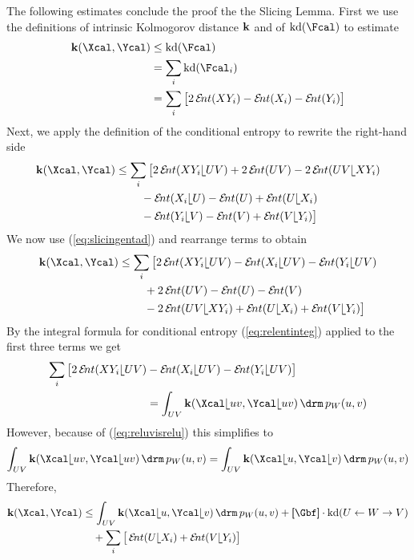 \begin{Proof}
  The following estimates conclude the proof the the Slicing Lemma.
  First we use the definitions of intrinsic Kolmogorov distance $\operatorname{\mathbf{k}}$
  and of $\kd(\Fcal)$ to estimate
  \begin{align*}
    \ikd(\Xcal,\Ycal)
    &\leq
    \kd(\Fcal)\\
    &=
    \sum_{i}\kd(\Fcal_{i})\\
    &=
    \sum_{i}\big[
      2\ent(XY_{i}) - \ent(X_{i}) - \ent(Y_{i})
      \big]
  \end{align*}
  Next, we apply the definition of the conditional entropy to rewrite
  the right-hand side
  \begin{align*}
    \ikd(\Xcal, \Ycal)
    &\leq  
    \sum_{i}\big[
      2\ent(XY_{i}\rel UV)+2\ent(UV)-2\ent(UV\rel XY_{i})\\
      &\quad\quad\;
      -\ent(X_{i}\rel U)-\ent(U)+\ent(U\rel X_{i})\\
      &\quad\quad\;
      -\ent(Y_{i}\rel V)-\ent(V)+\ent(V\rel Y_{i})\big]
  \end{align*}
  We now use (\ref{eq:slicingentad}) and rearrange terms to obtain
  \begin{align*}
    \ikd(\Xcal, \Ycal)
    &\leq
    \sum_{i}\big[
      2\ent(XY_{i}\rel UV)-\ent(X_{i}\rel UV)-\ent(Y_{i}\rel UV)\\ 
      &\quad\quad\;
      + 2\ent(UV) - \ent(U) - \ent(V)\\
      &\quad\quad\;
      - 2\ent(UV\rel XY_{i})
      +\ent(U\rel X_{i})
      +\ent(V\rel Y_{i})\big]
  \end{align*}
  By the integral formula for conditional
  entropy (\ref{eq:relentinteg}) applied to the first
  three terms we get
  \begin{align*}
    \sum_i 
    \big[
      2\ent(XY_{i}\rel UV)&-\ent(X_{i}\rel UV)-\ent(Y_{i}\rel UV)
    \big]
    \\
    &=
    \int_{UV}\ikd(\Xcal\rel{uv},\Ycal\rel uv)\d p_{W}(u,v)
  \end{align*}
  However, because of (\ref{eq:reluvisrelu}) this simplifies to
\[
\int_{UV}\ikd(\Xcal\rel{uv},\Ycal\rel uv)\d p_{W}(u,v)
= \int_{UV}\ikd(\Xcal\rel{u},\Ycal\rel v)\d p_{W}(u,v)
\]
Therefore,
  \begin{align*}
  \ikd(\Xcal, \Ycal)
  &\leq \int_{UV}\ikd(\Xcal\rel{u},\Ycal\rel v)\d p_{W}(u,v)+
  \size{\Gbf}\cdot\kd(U \ot W \to V) \\
  &\quad+ 
  \sum_{i}\big[\ent(U\rel X_{i})+\ent(V\rel Y_{i})\big]
  \end{align*}
  
\end{Proof}
  

